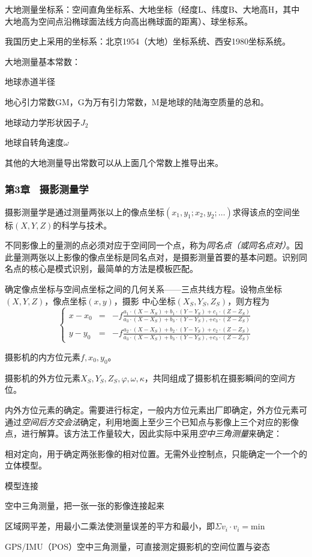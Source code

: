 大地测量坐标系：空间直角坐标系、大地坐标（经度L、纬度B、大地高H，其中大地高为空间点沿椭球面法线方向高出椭球面的距离）、球坐标系。

我国历史上采用的坐标系：北京1954（大地）坐标系统、西安1980坐标系统。

大地测量基本常数：
\begin{itemize*}
    \item 地球赤道半径
    \item 地心引力常数GM，G为万有引力常数，M是地球的陆海空质量的总和。
    \item 地球动力学形状因子$J_2$
    \item 地球自转角速度$\omega$
\end{itemize*}

其他的大地测量导出常数可以从上面几个常数上推导出来。

\subsubsection{第3章 \ 摄影测量学}

摄影测量学是通过测量两张以上的像点坐标$(x_1, y_1; x_2, y_2; \ldots)$求得该点的空间坐标$(X, Y, Z)$的科学与技术。

不同影像上的量测的点必须对应于空间同一个点，称为\emph{同名点（或同名点对）}。因此量测两张以上影像的像点坐标是同名点对，是摄影测量首要的基本问题。识别同名点的核心是模式识别，最简单的方法是模板匹配。

确定像点坐标与空间点坐标之间的几何关系——三点共线方程。设物点坐标$(X, Y, Z)$，像点坐标$(x, y)$，摄影 中心坐标$(X_S, Y_S, Z_S)$，则方程为
\begin{equation}
    \left \{ \begin{aligned}
    x-x_0 & = & -f \frac{a_1 \cdot (X-X_S) + b_1 \cdot (Y-Y_S) + c_1 \cdot (Z-Z_S)}{a_3 \cdot (X-X_S) + b_3 \cdot (Y-Y_S), + c_3 \cdot (Z-Z_S)}  \\
    y-y_0 & =  &-f \frac{a_2 \cdot (X-X_S) + b_2 \cdot (Y-Y_S) + c_2 \cdot (Z-Z_S)}{a_3 \cdot (X-X_S) + b_3 \cdot (Y-Y_S), + c_3 \cdot (Z-Z_S)} \end{aligned}
    \right .  
\end{equation}

摄影机的内方位元素$f, x_0, y_0$。

摄影机的外方位元素$X_S, Y_S, Z_S, \varphi, \omega, \kappa$，共同组成了摄影机在摄影瞬间的空间方位。

内外方位元素的确定。需要进行标定，一般内方位元素出厂即确定，外方位元素可通过\emph{空间后方交会法}确定，利用地面上至少三个已知点与影像上三个对应的影像点，进行解算。该方法工作量较大，因此实际中采用\emph{空中三角测量}来确定：
\begin{itemize*}
    \item 相对定向，用于确定两张影像的相对位置。无需外业控制点，只能确定一个一个的立体模型。
    \item 模型连接
    \item 空中三角测量，把一张一张的影像连接起来
    \item 区域网平差，用最小二乘法使测量误差的平方和最小，即$\Sigma v_i \cdot v_i = \mathrm{min}$
    \item GPS/IMU（POS）空中三角测量，可直接测定摄影机的空间位置与姿态
\end{itemize*}


